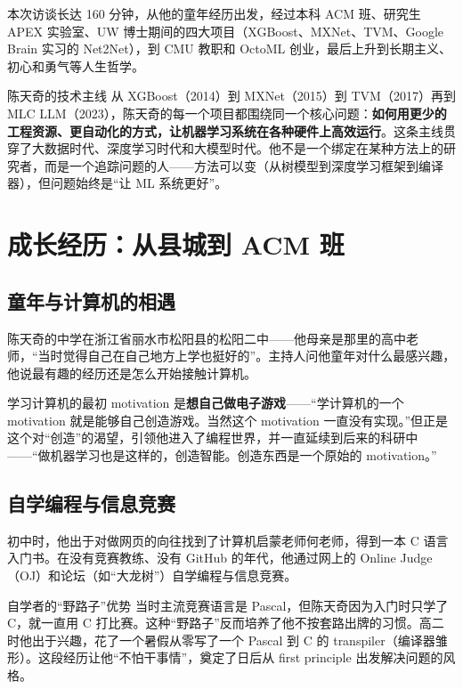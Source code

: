 \documentclass[a4paper]{article}
\begin{document}
本次访谈长达 160 分钟，从他的童年经历出发，经过本科 ACM 班、研究生 APEX 实验室、UW 博士期间的四大项目（XGBoost、MXNet、TVM、Google Brain 实习的 Net2Net），到 CMU 教职和 OctoML 创业，最后上升到长期主义、初心和勇气等人生哲学。

\begin{importantbox}{陈天奇的技术主线}
从 XGBoost（2014）到 MXNet（2015）到 TVM（2017）再到 MLC LLM（2023），陈天奇的每一个项目都围绕同一个核心问题：\textbf{如何用更少的工程资源、更自动化的方式，让机器学习系统在各种硬件上高效运行}。这条主线贯穿了大数据时代、深度学习时代和大模型时代。他不是一个绑定在某种方法上的研究者，而是一个追踪问题的人------方法可以变（从树模型到深度学习框架到编译器），但问题始终是``让 ML 系统更好''。
\end{importantbox}

\section{成长经历：从县城到 ACM 班}

\subsection{童年与计算机的相遇}

陈天奇的中学在浙江省丽水市松阳县的松阳二中------他母亲是那里的高中老师，``当时觉得自己在自己地方上学也挺好的''。主持人问他童年对什么最感兴趣，他说最有趣的经历还是怎么开始接触计算机。

学习计算机的最初 motivation 是\textbf{想自己做电子游戏}------``学计算机的一个 motivation 就是能够自己创造游戏。当然这个 motivation 一直没有实现。''但正是这个对``创造''的渴望，引领他进入了编程世界，并一直延续到后来的科研中------``做机器学习也是这样的，创造智能。创造东西是一个原始的 motivation。''

\subsection{自学编程与信息竞赛}

初中时，他出于对做网页的向往找到了计算机启蒙老师何老师，得到一本 C 语言入门书。在没有竞赛教练、没有 GitHub 的年代，他通过网上的 Online Judge（OJ）和论坛（如``大龙树''）自学编程与信息竞赛。

\begin{knowledgebox}{自学者的``野路子''优势}
当时主流竞赛语言是 Pascal，但陈天奇因为入门时只学了 C，就一直用 C 打比赛。这种``野路子''反而培养了他不按套路出牌的习惯。高二时他出于兴趣，花了一个暑假从零写了一个 Pascal 到 C 的 transpiler（编译器雏形）。这段经历让他``不怕干事情''，奠定了日后从 first principle 出发解决问题的风格。
\end{knowledgebox}
\end{document}
